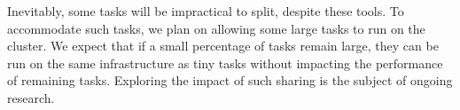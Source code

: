 Inevitably, some tasks will be impractical to split, despite these tools.
To accommodate such
tasks, we plan on allowing some large tasks to run on the cluster. We expect
that if a small percentage of tasks remain large, they can be run on the same
infrastructure as tiny tasks without impacting the performance of remaining tasks.
Exploring the impact of such sharing is the subject of ongoing research.
